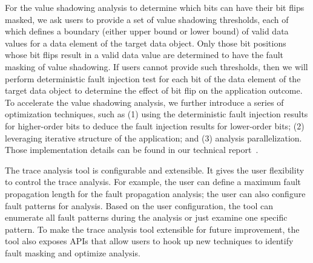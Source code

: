 For the value shadowing analysis to determine which bits can have their bit flips masked, we ask users to provide a set of value shadowing thresholds, each of which defines
a boundary (either upper bound or lower bound) of valid data values for a data element of the target data object. 
Only those bit positions whose bit flips result in a valid data value
are determined to have the fault masking of value shadowing.
If users cannot provide such thresholds, then we will perform deterministic fault injection test for each bit of the data element of the target data object to determine the effect of bit flip on the application outcome.
To accelerate the value shadowing analysis, we further introduce
a series of optimization techniques, such as (1) using the 
deterministic fault injection results for higher-order bits to deduce
the fault injection results for lower-order bits; (2) leveraging
iterative structure of the application;
and (3) analysis parallelization. 
Those implementation details can be found in our technical report~\cite{resilience_modeling:tr}. 

The trace analysis tool is configurable and extensible. 
It gives the user flexibility to control the trace analysis. %
For example, the user can define a maximum fault propagation length for the fault propagation analysis; %
the user can also configure fault patterns for analysis. 
Based on the user configuration, the tool can enumerate all fault patterns during the analysis or just examine one specific pattern.
To make the trace analysis tool extensible for future improvement,
the tool also exposes APIs that allow users to hook up new
techniques to identify fault masking and optimize analysis.

